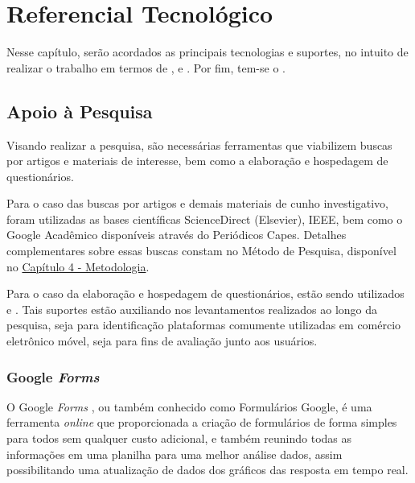 \chapter{Referencial Tecnológico} 
    \label{chap:ReferencialTecnologico}

Nesse capítulo, serão acordados as principais tecnologias e suportes, no intuito de realizar o trabalho em termos de ,  e . Por fim, tem-se o .


\section{Apoio à Pesquisa} 
    \label{pesquisa}

Visando realizar a pesquisa, são necessárias ferramentas que viabilizem buscas por artigos e materiais de interesse, bem como a elaboração e hospedagem de questionários. 

Para o caso das buscas por artigos e demais materiais de cunho investigativo, foram utilizadas as bases científicas ScienceDirect (Elsevier), IEEE, bem como o Google Acadêmico disponíveis através do Periódicos Capes. Detalhes complementares sobre essas buscas constam no Método de Pesquisa, disponível no \hyperref[chap:Metodologia]{Capítulo 4 - Metodologia}.

Para o caso da elaboração e hospedagem de questionários, estão sendo utilizados  e . Tais suportes estão auxiliando nos levantamentos realizados ao longo da pesquisa, seja para identificação plataformas comumente utilizadas em comércio eletrônico móvel, seja para fins de avaliação junto aos usuários.


\subsection{Google \textit{Forms}}
    \label{GoogleForms}

O Google \textit{Forms} \cite{GoogleForms}, ou também conhecido como Formulários Google, é uma ferramenta \textit{online} que proporcionada a criação de formulários de forma simples para todos sem qualquer custo adicional, e também reunindo todas as informações em uma planilha para uma melhor análise dados, assim possibilitando uma atualização de dados dos gráficos das resposta em tempo real.

